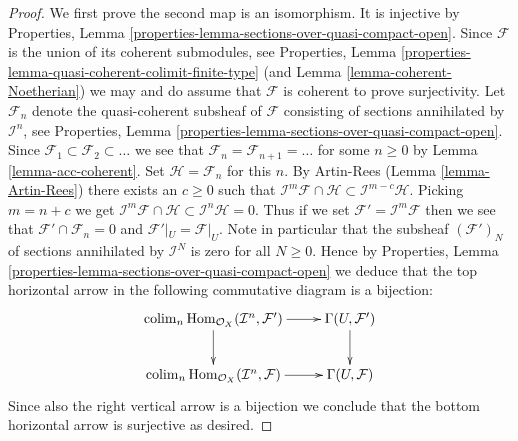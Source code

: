\documentclass{stacks-project}
\theoremstyle{plain}
\theoremstyle{definition}
\theoremstyle{remark}
\numberwithin{equation}{subsection}
\def\colim{\mathop{\mathrm{colim}}\nolimits}
\def\Hom{\mathop{\mathrm{Hom}}\nolimits}
\begin{document}
\begin{proof}
We first prove the second map is an isomorphism. It is injective by 
Properties, Lemma \ref{properties-lemma-sections-over-quasi-compact-open}.
Since $\mathcal{F}$ is the union of its coherent submodules, see
Properties, Lemma \ref{properties-lemma-quasi-coherent-colimit-finite-type}
(and Lemma \ref{lemma-coherent-Noetherian})
we may and do assume that $\mathcal{F}$ is coherent to prove surjectivity.
Let $\mathcal{F}_n$ denote the quasi-coherent subsheaf of $\mathcal{F}$
consisting of sections annihilated by $\mathcal{I}^n$,
see Properties, Lemma \ref{properties-lemma-sections-over-quasi-compact-open}.
Since $\mathcal{F}_1 \subset \mathcal{F}_2 \subset \ldots$ we see that
$\mathcal{F}_n = \mathcal{F}_{n + 1} = \ldots $ for some $n \geq 0$
by Lemma \ref{lemma-acc-coherent}. Set $\mathcal{H} = \mathcal{F}_n$
for this $n$. By Artin-Rees (Lemma \ref{lemma-Artin-Rees})
there exists an $c \geq 0$ such that
$\mathcal{I}^m\mathcal{F} \cap \mathcal{H}
\subset \mathcal{I}^{m - c}\mathcal{H}$. Picking $m = n + c$ we get
$\mathcal{I}^m\mathcal{F} \cap \mathcal{H} \subset \mathcal{I}^n\mathcal{H}
= 0$. Thus if we set $\mathcal{F}' = \mathcal{I}^m\mathcal{F}$ then we
see that $\mathcal{F}' \cap \mathcal{F}_n = 0$ and
$\mathcal{F}'|_U = \mathcal{F}|_U$. Note in particular that the subsheaf
$(\mathcal{F}')_N$ of sections annihilated by $\mathcal{I}^N$ is zero
for all $N \geq 0$. Hence by
Properties, Lemma \ref{properties-lemma-sections-over-quasi-compact-open}
we deduce that
the top horizontal arrow in the following commutative
diagram is a bijection:
$$
\xymatrix{
\colim_n \Hom_{\mathcal{O}_X}(
\mathcal{I}^n, \mathcal{F}')
\ar[r] \ar[d] &
\Gamma(U, \mathcal{F}') \ar[d] \\
\colim_n \Hom_{\mathcal{O}_X}(
\mathcal{I}^n, \mathcal{F})
\ar[r] &
\Gamma(U, \mathcal{F})
}
$$
Since also the right vertical arrow is a bijection we conclude that
the bottom horizontal arrow is surjective as desired.


\end{proof}
\end{document}
